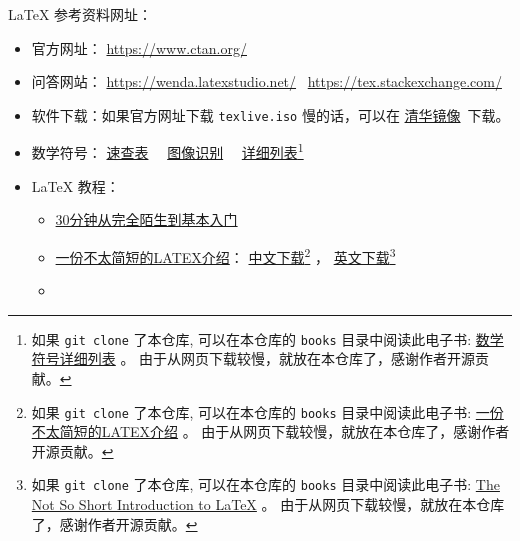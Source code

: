 \documentclass[
    11pt,
    base=hide,
    cite=authoryear,
    device=phone,
    lang=cn,
    mode=simple,
    result=answer,
    toc=onecol,
]{elegantsierxue310}
\begin{document}
\LaTeX{} 参考资料网址：
\begin{itemize}
    \item 官方网址： \href{https://www.ctan.org/}{https://www.ctan.org/}
    \item 问答网站：
        \href{https://wenda.latexstudio.net/}{https://wenda.latexstudio.net/}~%
        \href{https://tex.stackexchange.com/}{https://tex.stackexchange.com/}
    \item 软件下载：如果官方网址下载 \lstinline{texlive.iso} 慢的话，可以在
    \href{https://mirrors.tuna.tsinghua.edu.cn/CTAN/systems/texlive/Images/}
                {清华镜像}~下载。
    \item 数学符号： \href{books/latex-math-symbols.pdf}{速查表}~~%
        \href{http://detexify.kirelabs.org/classify.html} {图像识别}~~%
        \href{http://mirrors .ustc.edu.cn/CTAN/info/symbols/comprehensive/symbols-a4.pdf}
        {详细列表}\footnote{
            如果 \lstinline{git clone} 了本仓库,
            可以在本仓库的 \lstinline{books}
            目录中阅读此电子书:
            \href{books/symbols-a4.pdf}{数学符号详细列表} 。
            由于从网页下载较慢，就放在本仓库了，感谢作者开源贡献。
            }
    \item \LaTeX{} 教程：
        \begin{itemize}
            \item \href{https://www.latexstudio.net/archives/9377.html}
                {30分钟从完全陌生到基本入门}
            \item
                \href{https://www.ctan.org/tex-archive/info/lshort/chinese}
                {一份不太简短的LATEX介绍}：
        \href{http://mirrors.ctan.org/info/lshort/chinese/lshort-zh-cn.pdf}
                {中文下载}\footnote{
                    如果 \lstinline{git clone} 了本仓库,
                    可以在本仓库的 \lstinline{books}
                    目录中阅读此电子书:
                    \href{books/lshort-zh-cn.pdf}{一份不太简短的LATEX介绍} 。
                    由于从网页下载较慢，就放在本仓库了，感谢作者开源贡献。
                    }
                ，
        \href{http://mirrors.ctan.org/info/lshort/english/lshort.pdf}
                {英文下载}\footnote{
                    如果 \lstinline{git clone} 了本仓库,
                    可以在本仓库的 \lstinline{books}
                    目录中阅读此电子书:
                    \href{books/lshort.pdf}
                    {The Not So Short Introduction to LaTeX} 。
                    由于从网页下载较慢，就放在本仓库了，感谢作者开源贡献。
                    }
            \item

\end{itemize}
\end{itemize}
\end{document}

